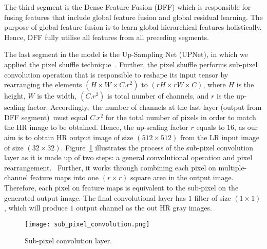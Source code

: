The third segment is the Dense Feature Fusion (DFF) which is responsible for fusing features that include global feature fusion and global residual learning.
The purpose of global feature fusion is to learn global hierarchical features holistically.
Hence, DFF fully utilise all features from all preceding segments.

The last segment in the model is the Up-Sampling Net (UPNet), in which we applied the pixel shuffle technique~\cite{Shi2016}.
Further, the pixel shuffle performs sub-pixel convolution operation that is responsible to reshape its input tensor by rearranging the elements \((H\times W\times C.r^2)\) to \((rH\times rW\times C)\), where \(H\) is the height, \(W\) is the width, \((C.r^2)\) is total number of channels, and \(r\) is the up-scaling factor.
Accordingly, the number of channels at the last layer (output from DFF segment) must equal \(C.r^2\) for the total number of pixels in order to match the HR image to be obtained.
Hence, the up-scaling factor \(r\) equals to \(16\), as our aim is to obtain HR output image of size \((512\times 512)\) from the LR input image of size \((32\times 32)\).
Figure~\ref{fig:sub_pixel_layer} illustrates the process of the sub-pixel convolution layer as it is made up of two steps: a general convolutional operation and pixel rearrangement. 
Further, it works through combining each pixel on multiple-channel feature maps into one \((r\times r)\) square area in the output image. 
Therefore, each pixel on feature maps is equivalent to the sub-pixel on the generated output image.
The final convolutional layer has \(1\) filter of size \((1\times 1)\), which will produce \(1\) output channel as the out HR gray images. 
\begin{figure} [h!]
	\begin{center}
		\texttt{[image: sub\_pixel\_convolution.png]}
	\end{center}
	\caption{Sub-pixel convolution layer.} 
	\label{fig:sub_pixel_layer}
\end{figure}
